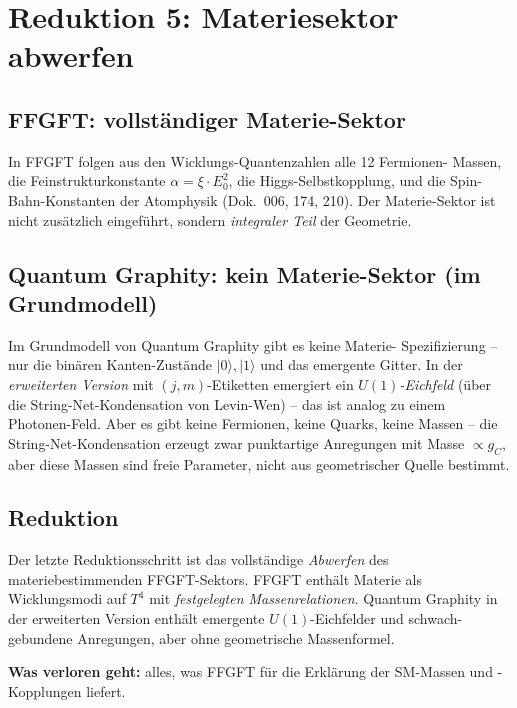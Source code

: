 \section{Reduktion 5: Materiesektor abwerfen}

\subsection{FFGFT: vollständiger Materie-Sektor}

In FFGFT folgen aus den Wicklungs-Quantenzahlen alle 12 Fermionen-
Massen, die Feinstrukturkonstante $\alpha = \xi \cdot E_0^2$, die
Higgs-Selbstkopplung, und die Spin-Bahn-Konstanten der Atomphysik
(Dok.~006, 174, 210). Der Materie-Sektor ist nicht zusätzlich
eingeführt, sondern \emph{integraler Teil} der Geometrie.

\subsection{Quantum Graphity: kein Materie-Sektor (im Grundmodell)}

Im Grundmodell von Quantum Graphity gibt es keine Materie-
Spezifizierung -- nur die binären Kanten-Zustände $|0\rangle, |1\rangle$
und das emergente Gitter. In der \emph{erweiterten Version} mit
$(j, m)$-Etiketten emergiert ein \emph{$U(1)$-Eichfeld} (über die
String-Net-Kondensation von Levin-Wen) -- das ist analog zu einem
Photonen-Feld. Aber es gibt keine Fermionen, keine Quarks, keine
Massen -- die String-Net-Kondensation erzeugt zwar punktartige
Anregungen mit Masse $\propto g_C$, aber diese Massen sind freie
Parameter, nicht aus geometrischer Quelle bestimmt.

\subsection{Reduktion}

Der letzte Reduktionsschritt ist das vollständige \emph{Abwerfen}
des materiebestimmenden FFGFT-Sektors. FFGFT enthält Materie als
Wicklungsmodi auf $T^4$ mit \emph{festgelegten Massenrelationen}.
Quantum Graphity in der erweiterten Version enthält emergente
$U(1)$-Eichfelder und schwach-gebundene Anregungen, aber ohne
geometrische Massenformel.

\textbf{Was verloren geht:} alles, was FFGFT für die Erklärung der
SM-Massen und -Kopplungen liefert.

